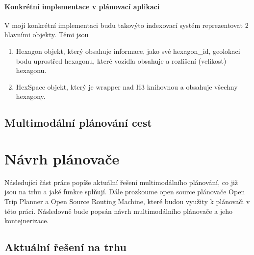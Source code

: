 \documentclass[thesis=M,czech]{FITthesis}[2019/12/23]
\theoremstyle{plain}
\theoremstyle{definition}
\begin{document}


\paragraph{Konkrétní implementace v plánovací aplikaci}

V mojí konkrétní implementaci budu takovýto indexovací systém reprezentovat 2 hlavními objekty. Těmi jsou 

\begin{enumerate}

	\item Hexagon objekt, který obsahuje informace, jako své hexagon\_id, geolokaci bodu uprostřed hexagonu, které vozidla obsahuje a rozlišení (velikost) hexagonu.

	\item HexSpace objekt, který je wrapper nad H3 knihovnou a obsahuje všechny hexagony.


\end{enumerate}
\subsection{Multimodální plánování cest}






\section{Návrh plánovače}

Následující část práce popíše aktuální řešení multimodálního plánování, co již jsou na trhu a jaké funkce splňují. Dále prozkoume open source plánovače Open Trip Planner a Open Source Routing Machine, které budou využity k plánovači v této práci. Následovně bude popsán návrh multimodálního plánovače a jeho kontejnerizace.

\subsection{Aktuální řešení na trhu}









\end{document}
